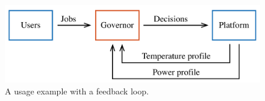 \begin{figure}
  \centering
  \includegraphics[width=1.0\columnwidth]{include/assets/figures/usage.pdf}
  \caption{A usage example with a feedback loop.}
\end{figure}
